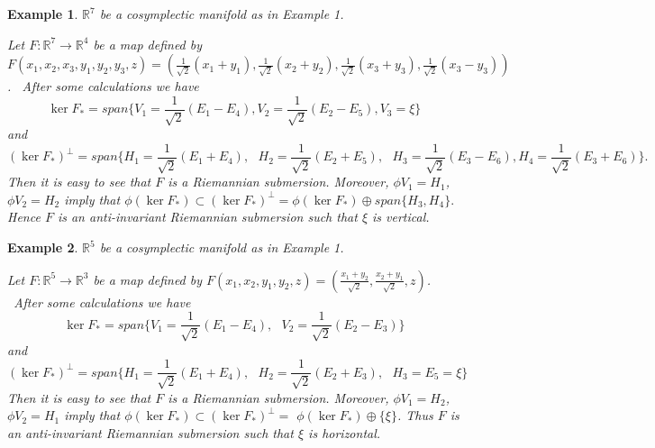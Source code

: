 \documentclass{amsart}
\theoremstyle{plain}
\newtheorem{example}{Example}
\numberwithin{equation}{section}
\begin{document}
\begin{example}
$\mathbb{R}
^{7}$ be a cosymplectic manifold as in Example 1.

Let $F:\mathbb{R}
^{7}\rightarrow 
\mathbb{R}
^{4}$ be a map defined by $F(x_{1},x_{2},x_{3},y_{1},y_{2},y_{3},z)=(\frac{1}{\sqrt{2}}(x_{1}+y_{1}),\frac{1}{\sqrt{2}}(x_{2}+y_{2}),\frac{1}{\sqrt{2}}(x_{3}+y_{3}),\frac{1}{\sqrt{2}}(x_{3}-y_{3}))$. \ After some calculations
we have\begin{equation*}
\ker F_{\ast }=span\{V_{1}=\frac{1}{\sqrt{2}}(E_{1}-E_{4}),V_{2}=\frac{1}{\sqrt{2}}(E_{2}-E_{5}),V_{3}=\xi \}
\end{equation*}and\begin{equation*}
(\ker F_{\ast })^{\bot }=span\{H_{1}=\frac{1}{\sqrt{2}}(E_{1}+E_{4}),\text{ }H_{2}=\frac{1}{\sqrt{2}}(E_{2}+E_{5}),\text{ }H_{3}=\frac{1}{\sqrt{2}}(E_{3}-E_{6}),H_{4}=\frac{1}{\sqrt{2}}(E_{3}+E_{6})\}.
\end{equation*}Then it is easy to see that $F$ is a Riemannian submersion. Moreover, $\phi
V_{1}=H_{1}$, $\phi V_{2}=H_{2}$ imply that $\phi (\ker F_{\ast })\subset
(\ker F_{\ast })^{\bot }=\phi (\ker F_{\ast })\oplus span\{H_{3},H_{4}\}.$Hence $F$ is an anti-invariant Riemannian submersion such that $\xi $ is
vertical.
\end{example}

\begin{example}
$\mathbb{R}
^{5}$ be a cosymplectic manifold as in Example 1.

Let $F:\mathbb{R}
^{5}\rightarrow 
\mathbb{R}
^{3}$ be a map defined by $F(x_{1},x_{2},y_{1},y_{2},z)=(\frac{x_{1}+y_{2}}{\sqrt{2}},\frac{x_{2}+y_{1}}{\sqrt{2}},z)$. \ After some calculations we have\begin{equation*}
\ker F_{\ast }=span\{V_{1}=\frac{1}{\sqrt{2}}(E_{1}-E_{4}),\text{ }V_{2}=\frac{1}{\sqrt{2}}(E_{2}-E_{3})\}
\end{equation*}and\begin{equation*}
(\ker F_{\ast })^{\bot }=span\{H_{1}=\frac{1}{\sqrt{2}}(E_{1}+E_{4}),\text{ }H_{2}=\frac{1}{\sqrt{2}}(E_{2}+E_{3}),\text{ }H_{3}=E_{5}=\xi \}
\end{equation*}Then it is easy to see that $F$ is a Riemannian submersion. Moreover, $\phi
V_{1}=H_{2}$, $\phi V_{2}=H_{1}$ imply that $\phi (\ker F_{\ast })\subset
(\ker F_{\ast })^{\bot }=$ $\phi (\ker F_{\ast })\oplus \{\xi \}$. Thus $F$
is an anti-invariant Riemannian submersion such that $\xi $ is horizontal.
\end{example}
\end{document}
